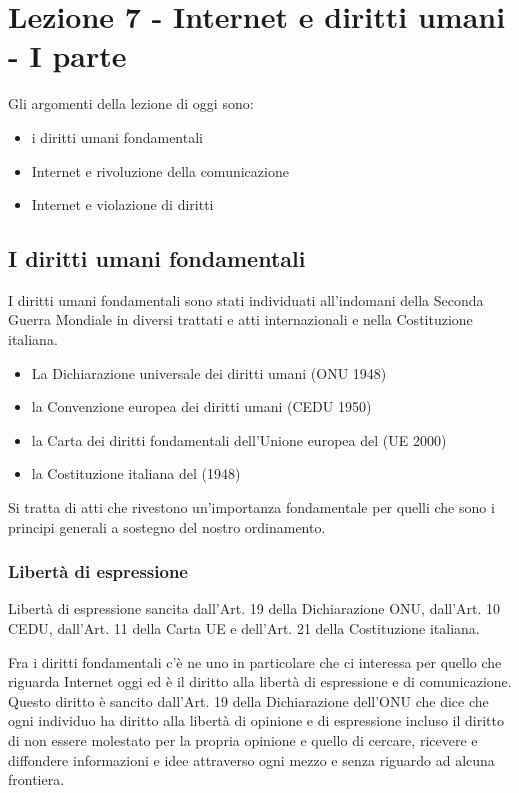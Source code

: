 \chapter{Lezione 7 - Internet e diritti umani - I parte}

Gli argomenti della lezione di oggi sono:

\begin{itemize}
    \item i diritti umani fondamentali  
    \item Internet e rivoluzione della comunicazione 
    \item Internet e violazione di diritti
\end{itemize}

\section{I diritti umani fondamentali}

I diritti umani fondamentali sono stati individuati all'indomani della Seconda Guerra Mondiale in diversi trattati e atti internazionali e nella Costituzione italiana.

\begin{itemize}
    \item La Dichiarazione universale dei diritti umani (ONU 1948) 
    \item la Convenzione europea dei diritti umani (CEDU 1950) 
    \item la Carta dei diritti fondamentali dell'Unione europea del (UE 2000)
    \item la Costituzione italiana del (1948)
\end{itemize}

Si tratta di atti che rivestono un'importanza fondamentale per quelli che sono i principi generali a sostegno del nostro ordinamento.

\subsection{Libertà di espressione}

Libertà di espressione sancita dall'Art. 19 della Dichiarazione ONU, dall'Art. 10 CEDU, dall'Art. 11 della Carta UE e dell'Art. 21 della Costituzione italiana. 

Fra i diritti fondamentali c'è ne uno in particolare che ci interessa per quello che riguarda Internet oggi ed è il diritto alla libertà di espressione e di comunicazione. Questo diritto è sancito dall'Art. 19 della Dichiarazione dell'ONU che dice che ogni individuo ha diritto alla libertà di opinione e di espressione incluso il diritto di non essere molestato per la propria opinione e quello di cercare, ricevere e diffondere informazioni e idee attraverso ogni mezzo e senza riguardo ad alcuna frontiera.

